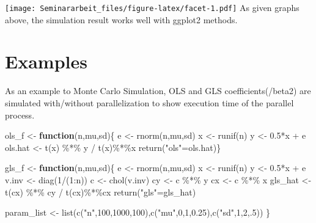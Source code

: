 \documentclass[11pt,a4paper]{article}
\newenvironment{Shaded}{\begin{snugshade}}{\end{snugshade}}
\newcommand{\ControlFlowTok}[1]{\textcolor[rgb]{0.13,0.29,0.53}{\textbf{#1}}}
\newcommand{\DecValTok}[1]{\textcolor[rgb]{0.00,0.00,0.81}{#1}}
\newcommand{\FloatTok}[1]{\textcolor[rgb]{0.00,0.00,0.81}{#1}}
\newcommand{\FunctionTok}[1]{\textcolor[rgb]{0.00,0.00,0.00}{#1}}
\newcommand{\NormalTok}[1]{#1}
\newcommand{\OtherTok}[1]{\textcolor[rgb]{0.56,0.35,0.01}{#1}}
\newcommand{\SpecialCharTok}[1]{\textcolor[rgb]{0.00,0.00,0.00}{#1}}
\newcommand{\StringTok}[1]{\textcolor[rgb]{0.31,0.60,0.02}{#1}}
\begin{document}
\texttt{[image: Seminararbeit\_files/figure-latex/facet-1.pdf]} As given
graphs above, the simulation result works well with ggplot2 methods.

\hypertarget{examples}{%
\section{Examples}\label{examples}}

As an example to Monte Carlo Simulation, OLS and GLS
coefficients(/beta2) are simulated with/without parallelization to show
execution time of the parallel process.

\begin{Shaded}
\begin{Highlighting}[]
\NormalTok{ols\_f }\OtherTok{\textless{}{-}} \ControlFlowTok{function}\NormalTok{(n,mu,sd)\{}
\NormalTok{  e }\OtherTok{\textless{}{-}} \FunctionTok{rnorm}\NormalTok{(n,mu,sd)}
\NormalTok{  x }\OtherTok{\textless{}{-}} \FunctionTok{runif}\NormalTok{(n)}
\NormalTok{  y }\OtherTok{\textless{}{-}} \FloatTok{0.5}\SpecialCharTok{*}\NormalTok{x }\SpecialCharTok{+}\NormalTok{ e}
\NormalTok{  ols.hat }\OtherTok{\textless{}{-}} \FunctionTok{t}\NormalTok{(x) }\SpecialCharTok{\%*\%}\NormalTok{ y }\SpecialCharTok{/} \FunctionTok{t}\NormalTok{(x)}\SpecialCharTok{\%*\%}\NormalTok{x}
  \FunctionTok{return}\NormalTok{(}\StringTok{"ols"}\OtherTok{=}\NormalTok{ols.hat)\}}

\NormalTok{gls\_f }\OtherTok{\textless{}{-}} \ControlFlowTok{function}\NormalTok{(n,mu,sd)\{}
\NormalTok{  e }\OtherTok{\textless{}{-}} \FunctionTok{rnorm}\NormalTok{(n,mu,sd)}
\NormalTok{  x }\OtherTok{\textless{}{-}} \FunctionTok{runif}\NormalTok{(n)}
\NormalTok{  y }\OtherTok{\textless{}{-}} \FloatTok{0.5}\SpecialCharTok{*}\NormalTok{x }\SpecialCharTok{+}\NormalTok{ e}
\NormalTok{  v.inv }\OtherTok{\textless{}{-}} \FunctionTok{diag}\NormalTok{(}\DecValTok{1}\SpecialCharTok{/}\NormalTok{(}\DecValTok{1}\SpecialCharTok{:}\NormalTok{n))}
\NormalTok{  c }\OtherTok{\textless{}{-}} \FunctionTok{chol}\NormalTok{(v.inv)}
\NormalTok{  cy }\OtherTok{\textless{}{-}}\NormalTok{ c }\SpecialCharTok{\%*\%}\NormalTok{ y}
\NormalTok{  cx }\OtherTok{\textless{}{-}}\NormalTok{ c }\SpecialCharTok{\%*\%}\NormalTok{ x}
\NormalTok{  gls\_hat }\OtherTok{\textless{}{-}} \FunctionTok{t}\NormalTok{(cx) }\SpecialCharTok{\%*\%}\NormalTok{ cy }\SpecialCharTok{/} \FunctionTok{t}\NormalTok{(cx)}\SpecialCharTok{\%*\%}\NormalTok{cx}
  \FunctionTok{return}\NormalTok{(}\StringTok{"gls"}\OtherTok{=}\NormalTok{gls\_hat)}
  
\NormalTok{  param\_list }\OtherTok{\textless{}{-}} \FunctionTok{list}\NormalTok{(}\FunctionTok{c}\NormalTok{(}\StringTok{"n"}\NormalTok{,}\DecValTok{100}\NormalTok{,}\DecValTok{1000}\NormalTok{,}\DecValTok{100}\NormalTok{),}\FunctionTok{c}\NormalTok{(}\StringTok{"mu"}\NormalTok{,}\DecValTok{0}\NormalTok{,}\DecValTok{1}\NormalTok{,}\FloatTok{0.25}\NormalTok{),}\FunctionTok{c}\NormalTok{(}\StringTok{"sd"}\NormalTok{,}\DecValTok{1}\NormalTok{,}\DecValTok{2}\NormalTok{,.}\DecValTok{5}\NormalTok{))}
\NormalTok{\}}
\end{Highlighting}
\end{Shaded}
\end{document}
